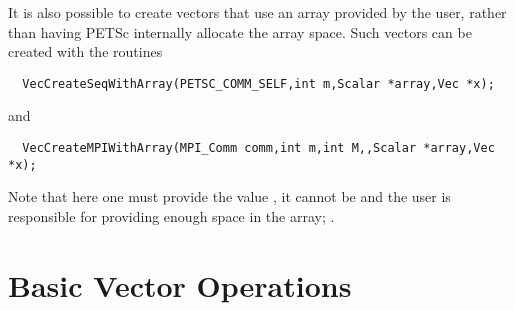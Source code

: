 It is also possible to create vectors that use an array provided by the user, 
rather than having PETSc internally allocate the array space. 
Such vectors can be created with the routines
\begin{verbatim}
  VecCreateSeqWithArray(PETSC_COMM_SELF,int m,Scalar *array,Vec *x);
\end{verbatim}
and   
\begin{verbatim}
  VecCreateMPIWithArray(MPI_Comm comm,int m,int M,,Scalar *array,Vec *x);
\end{verbatim}
Note that here one must provide the value , it cannot be  and
the user is responsible for providing enough space in the array; .


\section{Basic Vector Operations}  
\label{sec:vecbasic}

